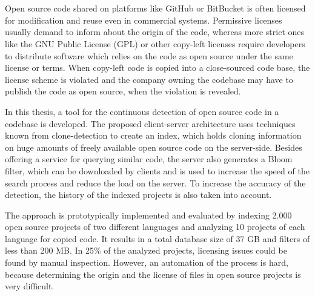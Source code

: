 \chapter{\abstractname}
Open source code shared on platforms like GitHub or BitBucket is often licensed for modification and reuse even in commercial systems.
Permissive licenses usually demand to inform about the origin of the code, whereas more strict ones like the GNU Public License (GPL) or other copy-left licenses require developers to distribute software which relies on the code as open source under the same license or terms.
When copy-left code is copied into a close-sourced code base, the license scheme is violated and the company owning the codebase may have to publish the code as open source, when the violation is revealed.

In this thesis, a tool for the continuous detection of open source code in a codebase is developed.
The proposed client-server architecture uses techniques known from clone-detection to create an index, which holds cloning information on huge amounts of freely available open source code on the server-side.
Besides offering a service for querying similar code, the server also generates a Bloom filter, which can be downloaded by clients and is used to increase the speed of the search process and reduce the load on the server.
To increase the accuracy of the detection, the history of the indexed projects is also taken into account.

The approach is prototypically implemented and evaluated by indexing 2.000 open source projects of two different languages and analyzing 10 projects of each language for copied code.
It results in a total database size of 37 GB and filters of less than 200 MB.
In 25\% of the analyzed projects, licensing issues could be found by manual inspection.
However, an automation of the process is hard, because determining the origin and the license of files in open source projects is very difficult.